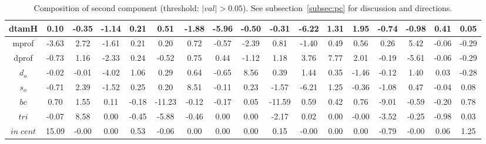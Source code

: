 \documentclass[%
 aip,
 jmp,%
 amsmath,amssymb,
 reprint,%
]{revtex4-1}
\begin{document}
\begin{table}
\begin{tabular}{|c|| c|c|c|c|| c|c|c|c|| c|c|c|c|| c|c|c|c|}
dtamH & 0.10 & -0.35 & -1.14 & 0.21 & 0.51 & -1.88 & -5.96 & -0.50 & -0.31 & -6.22 & 1.31 & 1.95 & -0.74 & -0.98 & 0.41 & 0.05 \\\hline
mprof & -3.63 & 2.72 & -1.61 & 0.21 & 0.20 & 0.72 & -0.57 & -2.39 & 0.81 & -1.40 & 0.49 & 0.56 & 0.26 & 5.42 & -0.06 & -0.29 \\\hline
dprof & -0.73 & 1.16 & -2.33 & 0.24 & -0.52 & 0.75 & 0.44 & -1.12 & 1.18 & 3.76 & 7.77 & 2.01 & -0.19 & -5.61 & -0.06 & -0.29 \\\hline
$d_o$ & -0.02 & -0.01 & -4.02 & 1.06 & 0.29 & 0.64 & -0.65 & 8.56 & 0.39 & 1.44 & 0.35 & -1.46 & -0.12 & 1.40 & 0.03 & -0.28 \\\hline
$s_o$ & -0.71 & 2.39 & -1.52 & 0.25 & 0.20 & 8.51 & -0.11 & 0.23 & -1.57 & -6.21 & 1.25 & -0.36 & -1.08 & 0.47 & -0.04 & 0.08 \\\hline
$bc$ & 0.70 & 1.55 & 0.11 & -0.18 & -11.23 & -0.12 & -0.17 & 0.05 & -11.59 & 0.59 & 0.42 & 0.76 & -9.01 & -0.59 & -0.20 & 0.78 \\\hline
$tri$ & -0.07 & 8.58 & 0.00 & -0.45 & -5.88 & -0.46 & 0.00 & 0.00 & -2.17 & 0.02 & 0.00 & -0.00 & -3.52 & -0.25 & -0.98 & 0.03 \\\hline
$in\;cent$ & 15.09 & -0.00 & 0.00 & 0.53 & -0.06 & 0.00 & 0.00 & 0.00 & 0.15 & -0.00 & 0.00 & 0.00 & -0.79 & -0.00 & 0.06 & 1.25 \\\hline
\end{tabular}
  \caption{Composition of second component (threshold: $|val|>0.05$). See subsection~\ref{subsec:pc} for discussion and directions.}\label{tab:pca2}
\end{table}
\end{document}
